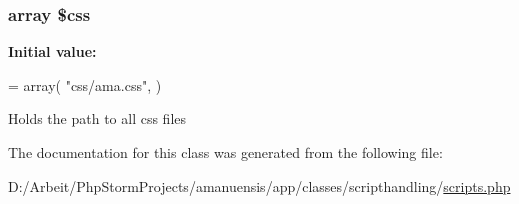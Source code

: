 \subsubsection[{\$css}]{\setlength{\rightskip}{0pt plus 5cm}array \$css\hspace{0.3cm}{\ttfamily [static]}}\label{a00043_ab2cede1cb181d8cd87d9a8f5570aa121}
{\bfseries Initial value\+:}
\begin{DoxyCode}
= array(
        \textcolor{stringliteral}{"css/ama.css"},
    )
\end{DoxyCode}
Holds the path to all css files 

The documentation for this class was generated from the following file\+:\begin{DoxyCompactItemize}
\item 
D\+:/\+Arbeit/\+Php\+Storm\+Projects/amanuensis/app/classes/scripthandling/\hyperlink{a00104}{scripts.\+php}\end{DoxyCompactItemize}
